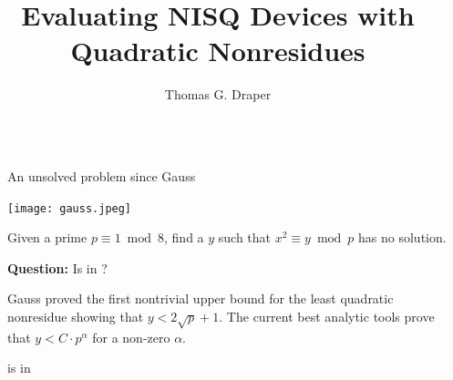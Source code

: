 \documentclass[final]{beamer}
\title{Evaluating NISQ Devices with Quadratic Nonresidues}
\author{Thomas G. Draper}
\institute[shortinst]{Center for Communications Research at La Jolla}
\providecommand{\QNR}{\csword{QNR}}
\newlength{\sepwidth}
\newlength{\colwidth}
\newcommand{\separatorcolumn}{\begin{column}{\sepwidth}\end{column}}
\begin{document}
\begin{frame}[t]

\begin{columns}[t]
\separatorcolumn

\begin{column}{\colwidth}

  \begin{block}{An unsolved problem since Gauss}
  \begin{minipage}[c]{0.3\colwidth}
    \texttt{[image: gauss.jpeg]}
  \end{minipage}
  \begin{minipage}[l]{0.7\colwidth}
    \bigskip

    Given a prime $p\equiv 1\bmod 8$, find a $y$ such that $x^2\equiv y \bmod p$ has no solution.  

    \bigskip
  {\bf Question:} Is \QNR in \xP?
    \bigskip
  \end{minipage}

Gauss proved the first nontrivial upper bound for the least quadratic nonresidue showing that $y<2\sqrt{p}+1$.
The current best analytic tools prove that $y < C\cdot p^\alpha$ for a non-zero $\alpha$.
  \end{block}

  \begin{exampleblock}{\QNR is in \EQPC}


\end{exampleblock}
\end{column}
\end{columns}
\end{frame}
\end{document}
